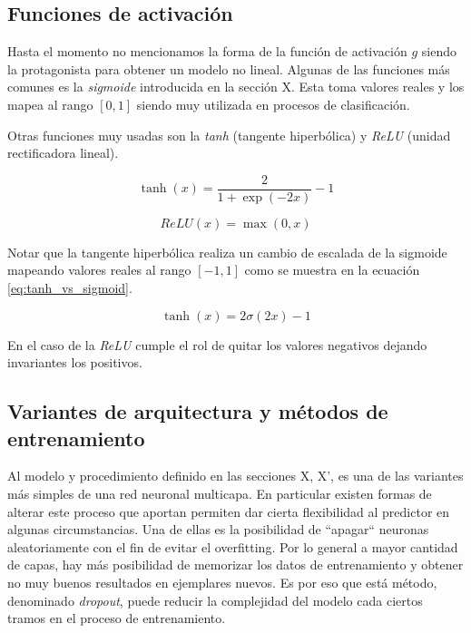 \subsection{Funciones de activación}

Hasta el momento no mencionamos la forma de la función de activación $g$ siendo
la protagonista para obtener un modelo no lineal. Algunas de las funciones más
comunes es la \emph{sigmoide} introducida en la sección X. Esta toma valores
reales y los mapea al rango $[0, 1]$ siendo muy utilizada en procesos de
clasificación.

Otras funciones muy usadas son la \emph{tanh} (tangente hiperbólica) y
\emph{ReLU} (unidad rectificadora lineal).

\begin{equation}
    \tanh\left( x \right) = \frac{2}{1 + \exp(-2x)} - 1
\end{equation}

\begin{equation}
    ReLU\left( x \right) = \max(0, x)
\end{equation}

Notar que la tangente hiperbólica realiza un cambio de escalada de la sigmoide
mapeando valores reales al rango $[-1, 1]$ como se muestra en la ecuación \ref{eq:tanh_vs_sigmoid}.

\begin{equation} \label{eq:tanh_vs_sigmoid}
    \tanh\left( x \right) = 2 \sigma(2x) - 1
\end{equation}

En el caso de la \emph{ReLU} cumple el rol de quitar los valores negativos
dejando invariantes los positivos.

\subsection{Variantes de arquitectura y métodos de entrenamiento}

Al modelo y procedimiento definido en las secciones X, X', es una de las
variantes más simples de una red neuronal multicapa. En particular existen
formas de alterar este proceso que aportan permiten dar cierta flexibilidad al
predictor en algunas circumstancias. Una de ellas es la posibilidad de
``apagar`` neuronas aleatoriamente con el fin de evitar el overfitting. Por lo
general a mayor cantidad de capas, hay más posibilidad de memorizar los datos de
entrenamiento y obtener no muy buenos resultados en ejemplares nuevos. Es por
eso que está método, denominado \emph{dropout}, puede reducir la complejidad del
modelo cada ciertos tramos en el proceso de entrenamiento.


